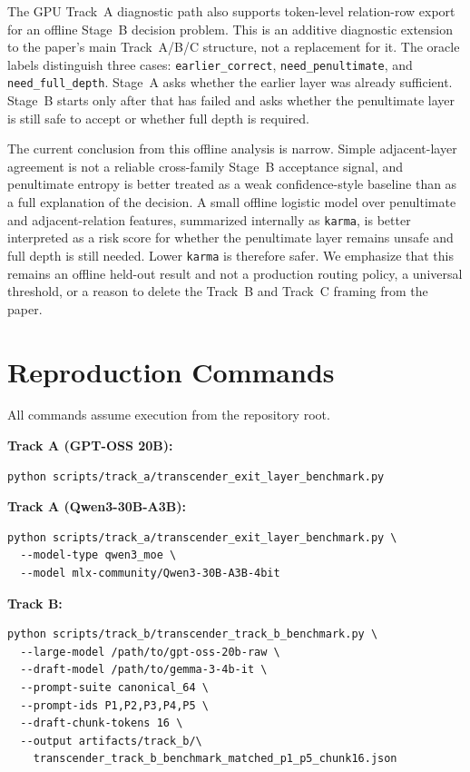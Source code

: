 \documentclass[11pt]{article}
\begin{document}
The GPU Track~A diagnostic path also supports token-level relation-row export for an offline Stage~B decision problem. This is an additive diagnostic extension to the paper's main Track~A/B/C structure, not a replacement for it. The oracle labels distinguish three cases: \texttt{earlier\_correct}, \texttt{need\_penultimate}, and \texttt{need\_full\_depth}. Stage~A asks whether the earlier layer was already sufficient. Stage~B starts only after that has failed and asks whether the penultimate layer is still safe to accept or whether full depth is required.

The current conclusion from this offline analysis is narrow. Simple adjacent-layer agreement is not a reliable cross-family Stage~B acceptance signal, and penultimate entropy is better treated as a weak confidence-style baseline than as a full explanation of the decision. A small offline logistic model over penultimate and adjacent-relation features, summarized internally as \texttt{karma}, is better interpreted as a risk score for whether the penultimate layer remains unsafe and full depth is still needed. Lower \texttt{karma} is therefore safer. We emphasize that this remains an offline held-out result and not a production routing policy, a universal threshold, or a reason to delete the Track~B and Track~C framing from the paper.

\section{Reproduction Commands}
\label{app:repro}

\noindent All commands assume execution from the repository root.

\smallskip
\noindent\textbf{Track A (GPT-OSS 20B):}
{\small
\begin{verbatim}
python scripts/track_a/transcender_exit_layer_benchmark.py
\end{verbatim}
}

\noindent\textbf{Track A (Qwen3-30B-A3B):}
{\small
\begin{verbatim}
python scripts/track_a/transcender_exit_layer_benchmark.py \
  --model-type qwen3_moe \
  --model mlx-community/Qwen3-30B-A3B-4bit
\end{verbatim}
}

\noindent\textbf{Track B:}
{\small
\begin{verbatim}
python scripts/track_b/transcender_track_b_benchmark.py \
  --large-model /path/to/gpt-oss-20b-raw \
  --draft-model /path/to/gemma-3-4b-it \
  --prompt-suite canonical_64 \
  --prompt-ids P1,P2,P3,P4,P5 \
  --draft-chunk-tokens 16 \
  --output artifacts/track_b/\
    transcender_track_b_benchmark_matched_p1_p5_chunk16.json
\end{verbatim}
}
\end{document}
